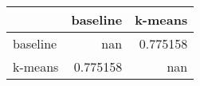 \begin{tabular}{lrr}
\toprule
          &   baseline &    k-means \\
\midrule
 baseline & nan        &   0.775158 \\
 k-means  &   0.775158 & nan        \\
\bottomrule
\end{tabular}